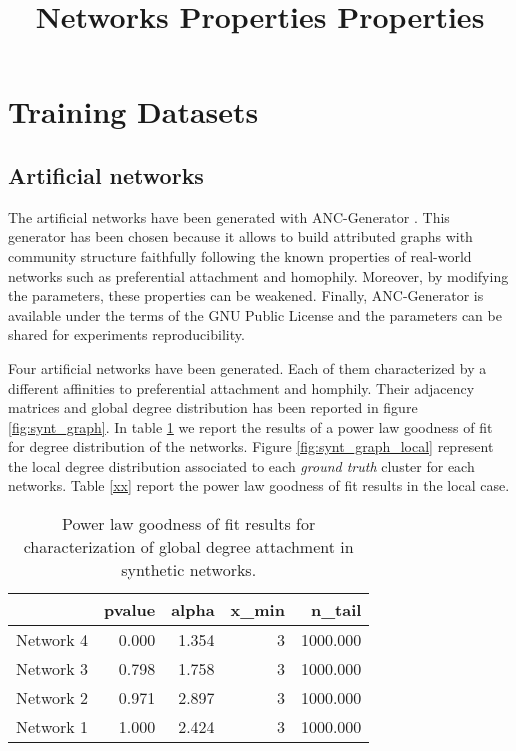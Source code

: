 \documentclass[a4paper, 12pt]{article}
\title{Networks Properties Properties}
\begin{document}
\maketitle
\tableofcontents

\section{Training Datasets}

\subsection{Artificial networks}

The artificial networks have been generated with ANC-Generator \cite{largeron2015}. This generator has been chosen because it allows to build attributed graphs with  community structure faithfully following the known properties of real-world networks such as preferential attachment and homophily.
Moreover, by modifying the parameters, these properties can be weakened. Finally, ANC-Generator is available under the terms of the GNU Public License and the        parameters can be shared for experiments reproducibility.

Four artificial networks have been generated. Each of them characterized by a different affinities to preferential attachment and homphily. Their adjacency matrices and global degree distribution has been reported in figure \ref{fig:synt_graph}. In table \ref{table:synt_graph} we report the results of a power law goodness of fit for degree distribution of the networks. Figure \ref{fig:synt_graph_local} represent the local degree distribution associated to each \emph{ground truth} cluster for each networks. Table \ref{xx} report the power law goodness of fit results in the local case.





\begin{table}[h]
\label{table:synt_graph}
\caption{Power law goodness of fit results for characterization of global degree attachment in synthetic networks.}
\centering
\begin{tabular}{lrrrr}
\hline
           &   pvalue &   alpha &   x\_min &   n\_tail \\
\hline
 Network 4 &    0.000 &   1.354 &       3 & 1000.000 \\
 Network 3 &    0.798 &   1.758 &       3 & 1000.000 \\
 Network 2 &    0.971 &   2.897 &       3 & 1000.000 \\
 Network 1 &    1.000 &   2.424 &       3 & 1000.000 \\
\hline
\end{tabular}
\end{table}
\end{document}
